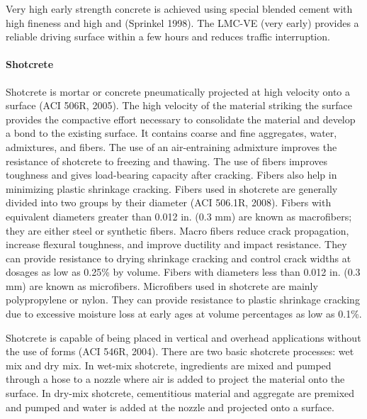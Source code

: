 Very high early strength concrete is achieved using special blended cement with high fineness and high  and  (Sprinkel 1998). The LMC-VE (very early) provides a reliable driving surface within a few hours and
reduces traffic interruption.

\paragraph{Shotcrete}
Shotcrete is mortar or concrete pneumatically projected at high velocity onto a surface (ACI 506R, 2005). The high velocity of the material striking the surface provides the compactive effort necessary to consolidate the material and develop a bond to the existing surface. It contains coarse and fine aggregates, water, admixtures, and fibers. The use of an air-entraining admixture improves the resistance of shotcrete to freezing and thawing. The use of fibers improves toughness and gives load-bearing capacity after cracking. Fibers also help in minimizing plastic shrinkage cracking. Fibers used in shotcrete are generally divided into two groups by their diameter (ACI 506.1R, 2008).  Fibers with equivalent diameters greater than 0.012 in. (0.3 mm) are known as macrofibers; they are either steel or synthetic fibers. Macro fibers reduce crack propagation, increase flexural toughness, and improve ductility and impact resistance. They can provide resistance to drying shrinkage cracking and control crack widths at dosages as low as 0.25\% by volume. Fibers with diameters less than 0.012 in. (0.3 mm) are known as microfibers. Microfibers used in shotcrete are mainly polypropylene or nylon. They can provide resistance to plastic shrinkage cracking due to excessive moisture loss at early ages at volume percentages as low as 0.1\%.

Shotcrete is capable of being placed in vertical and overhead applications without the use of forms (ACI 546R, 2004). There are two basic shotcrete processes: wet mix and dry mix. In wet-mix shotcrete, ingredients are mixed and pumped through a hose to a nozzle where air is added to project the material onto the surface. In dry-mix shotcrete, cementitious material and aggregate are premixed and pumped and water is added at the nozzle and projected onto a surface.

